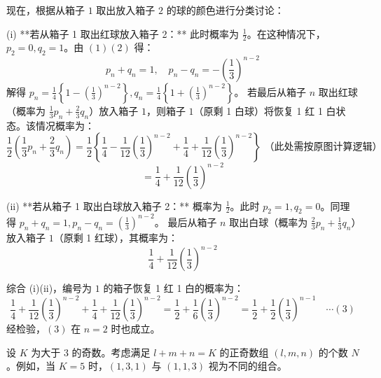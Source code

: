 \begin{questions}
\begin{solution}
    现在，根据从箱子 $1$ 取出放入箱子 $2$ 的球的颜色进行分类讨论：
    
    (i) **若从箱子 1 取出红球放入箱子 2：**
    此时概率为 $\frac{1}{2}$。在这种情况下，$p_2 = 0, q_2 = 1$。由 $(1) (2)$ 得：
    \[ p_n + q_n = 1, \quad p_n - q_n = - \left( \frac{1}{3} \right)^{n-2}  \]
    解得 $p_n = \frac{1}{4} \left\{ 1 - \left( \frac{1}{3} \right)^{n-2} \right\}, q_n = \frac{1}{4} \left\{ 1 + \left( \frac{1}{3} \right)^{n-2} \right\}$。
    若最后从箱子 $n$ 取出红球（概率为 $\frac{1}{3}p_n + \frac{2}{3}q_n$）放入箱子 $1$，则箱子 $1$（原剩 1 白球）将恢复 1 红 1 白状态。该情况概率为：
    \[ \frac{1}{2} \left( \frac{1}{3}p_n + \frac{2}{3}q_n \right) = \frac{1}{2} \left\{ \frac{1}{4} - \frac{1}{12} \left( \frac{1}{3} \right)^{n-2} + \frac{1}{4} + \frac{1}{12} \left( \frac{1}{3} \right)^{n-2} \right\} \text{ （此处需按原图计算逻辑）} \]
    \[ = \frac{1}{4} + \frac{1}{12} \left( \frac{1}{3} \right)^{n-2}  \]

    (ii) **若从箱子 1 取出白球放入箱子 2：**
    概率为 $\frac{1}{2}$。此时 $p_2 = 1, q_2 = 0$。同理得 $p_n + q_n = 1, p_n - q_n = \left( \frac{1}{3} \right)^{n-2}$。
    最后从箱子 $n$ 取出白球（概率为 $\frac{2}{3}p_n + \frac{1}{3}q_n$）放入箱子 $1$（原剩 1 红球），其概率为：
    \[ \frac{1}{4} + \frac{1}{12} \left( \frac{1}{3} \right)^{n-2}  \]

    综合 (i)(ii)，编号为 $1$ 的箱子恢复 1 红 1 白的概率为：
    \[ \frac{1}{4} + \frac{1}{12} \left( \frac{1}{3} \right)^{n-2} + \frac{1}{4} + \frac{1}{12} \left( \frac{1}{3} \right)^{n-2} = \frac{1}{2} + \frac{1}{6} \left( \frac{1}{3} \right)^{n-2} = \frac{1}{2} + \frac{1}{2} \left( \frac{1}{3} \right)^{n-1} \quad \cdots (3)  \]
    经检验，$(3)$ 在 $n=2$ 时也成立。
\end{solution}

\question
设 $K$ 为大于 $3$ 的奇数。考虑满足 $l + m + n = K$ 的正奇数组 $(l, m, n)$ 的个数 $N$。例如，当 $K=5$ 时，$(1, 3, 1)$ 与 $(1, 1, 3)$ 视为不同的组合。

\end{questions}
